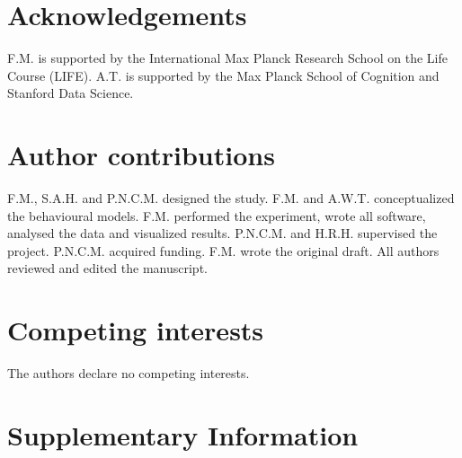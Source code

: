 \documentclass[11pt, a4paper]{article}
\begin{document}
\section*{Acknowledgements}
F.M. is supported by the International Max Planck Research School on the Life Course (LIFE). A.T. is supported by the Max Planck School of Cognition and Stanford Data Science.

\section*{Author contributions}
F.M., S.A.H. and P.N.C.M. designed the study. F.M. and A.W.T. conceptualized the behavioural models. F.M. performed the experiment, wrote all software, analysed the data and visualized results. P.N.C.M. and H.R.H. supervised the project. P.N.C.M. acquired funding. F.M. wrote the original draft. All authors reviewed and edited the manuscript.

\section*{Competing interests}
The authors declare no competing interests.

\renewcommand*{\bibfont}{\small}
\printbibliography
\newpage

\section*{Supplementary Information}
\label{sec:supplement}
\end{document}
